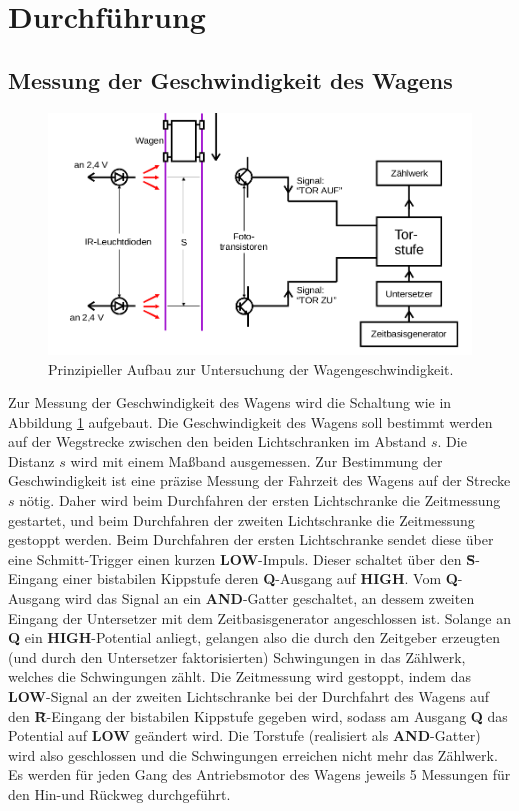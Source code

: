 \section{Durchführung}
\label{sec:Durchführung}
\subsection{Messung der Geschwindigkeit des Wagens}
\label{sec:speedygonzales}
\begin{figure}
	\includegraphics{Bilder/wagengeschwindigkeit.png}
	\caption{Prinzipieller Aufbau zur Untersuchung der Wagengeschwindigkeit. \cite{Anleitung}}
	\label{fig:wagen} %
\end{figure}
Zur Messung der Geschwindigkeit des Wagens wird die Schaltung wie in Abbildung \ref{fig:wagen} aufgebaut.
Die Geschwindigkeit des Wagens soll bestimmt werden auf der Wegstrecke zwischen den beiden Lichtschranken im Abstand $s$.
Die Distanz $s$ wird mit einem Maßband ausgemessen.
Zur Bestimmung der Geschwindigkeit ist eine präzise Messung der Fahrzeit des Wagens auf der Strecke $s$ nötig.
Daher wird beim Durchfahren der ersten Lichtschranke die Zeitmessung gestartet, und beim Durchfahren der zweiten Lichtschranke die Zeitmessung gestoppt werden.
Beim Durchfahren der ersten Lichtschranke sendet diese über eine Schmitt-Trigger einen kurzen \textbf{LOW}-Impuls. Dieser schaltet über den \textbf{\={S}}-Eingang einer bistabilen Kippstufe deren \textbf{Q}-Ausgang auf \textbf{HIGH}.
Vom \textbf{Q}-Ausgang wird das Signal an ein \textbf{AND}-Gatter geschaltet,
an dessem zweiten Eingang der Untersetzer mit dem Zeitbasisgenerator angeschlossen ist.
Solange an \textbf{Q} ein \textbf{HIGH}-Potential anliegt, gelangen also die durch den Zeitgeber erzeugten (und durch den Untersetzer faktorisierten) Schwingungen in das Zählwerk, welches die Schwingungen zählt.
Die Zeitmessung wird gestoppt, indem das \textbf{LOW}-Signal an der zweiten Lichtschranke  bei der Durchfahrt des Wagens auf den \textbf{\={R}}-Eingang der bistabilen Kippstufe gegeben wird,
sodass am Ausgang \textbf{Q} das Potential auf \textbf{LOW} geändert wird. Die Torstufe (realisiert als \textbf{AND}-Gatter) wird also geschlossen und die Schwingungen erreichen nicht mehr das Zählwerk.
Es werden für jeden Gang des Antriebsmotor des Wagens jeweils 5 Messungen für den Hin-und Rückweg durchgeführt.


